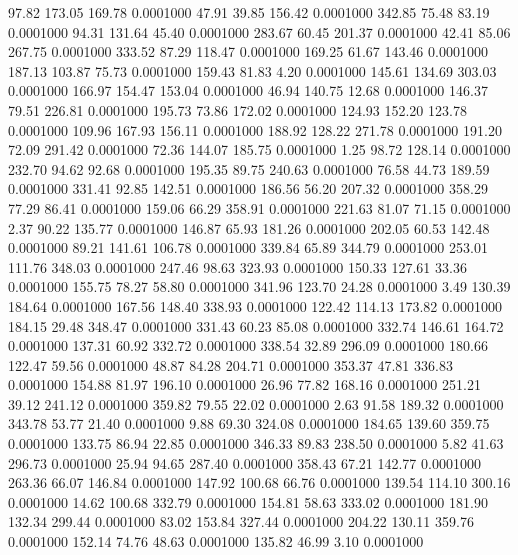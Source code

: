   97.82  173.05  169.78   0.0001000
  47.91   39.85  156.42   0.0001000
 342.85   75.48   83.19   0.0001000
  94.31  131.64   45.40   0.0001000
 283.67   60.45  201.37   0.0001000
  42.41   85.06  267.75   0.0001000
 333.52   87.29  118.47   0.0001000
 169.25   61.67  143.46   0.0001000
 187.13  103.87   75.73   0.0001000
 159.43   81.83    4.20   0.0001000
 145.61  134.69  303.03   0.0001000
 166.97  154.47  153.04   0.0001000
  46.94  140.75   12.68   0.0001000
 146.37   79.51  226.81   0.0001000
 195.73   73.86  172.02   0.0001000
 124.93  152.20  123.78   0.0001000
 109.96  167.93  156.11   0.0001000
 188.92  128.22  271.78   0.0001000
 191.20   72.09  291.42   0.0001000
  72.36  144.07  185.75   0.0001000
   1.25   98.72  128.14   0.0001000
 232.70   94.62   92.68   0.0001000
 195.35   89.75  240.63   0.0001000
  76.58   44.73  189.59   0.0001000
 331.41   92.85  142.51   0.0001000
 186.56   56.20  207.32   0.0001000
 358.29   77.29   86.41   0.0001000
 159.06   66.29  358.91   0.0001000
 221.63   81.07   71.15   0.0001000
   2.37   90.22  135.77   0.0001000
 146.87   65.93  181.26   0.0001000
 202.05   60.53  142.48   0.0001000
  89.21  141.61  106.78   0.0001000
 339.84   65.89  344.79   0.0001000
 253.01  111.76  348.03   0.0001000
 247.46   98.63  323.93   0.0001000
 150.33  127.61   33.36   0.0001000
 155.75   78.27   58.80   0.0001000
 341.96  123.70   24.28   0.0001000
   3.49  130.39  184.64   0.0001000
 167.56  148.40  338.93   0.0001000
 122.42  114.13  173.82   0.0001000
 184.15   29.48  348.47   0.0001000
 331.43   60.23   85.08   0.0001000
 332.74  146.61  164.72   0.0001000
 137.31   60.92  332.72   0.0001000
 338.54   32.89  296.09   0.0001000
 180.66  122.47   59.56   0.0001000
  48.87   84.28  204.71   0.0001000
 353.37   47.81  336.83   0.0001000
 154.88   81.97  196.10   0.0001000
  26.96   77.82  168.16   0.0001000
 251.21   39.12  241.12   0.0001000
 359.82   79.55   22.02   0.0001000
   2.63   91.58  189.32   0.0001000
 343.78   53.77   21.40   0.0001000
   9.88   69.30  324.08   0.0001000
 184.65  139.60  359.75   0.0001000
 133.75   86.94   22.85   0.0001000
 346.33   89.83  238.50   0.0001000
   5.82   41.63  296.73   0.0001000
  25.94   94.65  287.40   0.0001000
 358.43   67.21  142.77   0.0001000
 263.36   66.07  146.84   0.0001000
 147.92  100.68   66.76   0.0001000
 139.54  114.10  300.16   0.0001000
  14.62  100.68  332.79   0.0001000
 154.81   58.63  333.02   0.0001000
 181.90  132.34  299.44   0.0001000
  83.02  153.84  327.44   0.0001000
 204.22  130.11  359.76   0.0001000
 152.14   74.76   48.63   0.0001000
 135.82   46.99    3.10   0.0001000
